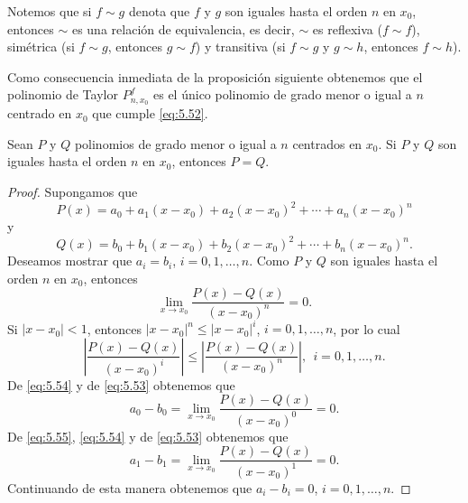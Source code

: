 \documentclass[12pt,a4paper]{book}
\begin{document}
    Notemos que si $f\sim g$ denota que $f$ y $g$ son iguales hasta el orden $n$ en $x_{0}$,
    entonces $\sim$ es una relación de equivalencia, es decir, $\sim$ es reflexiva ($f\sim f$),
    simétrica (si $f\sim g$, entonces $g\sim f$) y transitiva (si $f\sim g$ y $g\sim h$, entonces
    $f\sim h$).

    Como consecuencia inmediata de la proposición siguiente obtenemos que
    el polinomio de Taylor $P^{f}_{n,x_{0}}$ es el único polinomio de grado menor o igual a
    $n$ centrado en $x_{0}$ que cumple \eqref{eq:5.52}.

    \begin{proposicion}\label{prop:70}
        Sean $P$ y $Q$ polinomios de grado menor o igual a $n$ centrados
        en $x_{0}$. Si $P$ y $Q$ son iguales hasta el orden $n$ en $x_{0}$, entonces $P=Q$.
    \end{proposicion}

    \begin{proof}
        Supongamos que
        \begin{equation*}
            P(x)=a_{0}+a_{1}(x-x_{0})+a_{2}(x-x_{0})^{2}+\cdots+a_{n}(x-x_{0})^{n}
        \end{equation*}
        y
        \begin{equation*}
            Q(x)=b_{0}+b_{1}(x-x_{0})+b_{2}(x-x_{0})^{2}+\cdots+b_{n}(x-x_{0})^{n}.
        \end{equation*}
        Deseamos mostrar que $a_{i}=b_{i}$, $i=0,1,\ldots,n$. Como $P$ y $Q$ son iguales hasta
        el orden $n$ en $x_{0}$, entonces
        \begin{equation}\label{eq:5.53}
            \lim_{x\to x_{0}}\frac{P(x)-Q(x)}{(x-x_{0})^{n}}=0.
        \end{equation}
        Si $|x-x_{0}|<1$, entonces $|x-x_{0}|^{n}\leq|x-x_{0}|^{i}$, $i=0,1,\ldots,n$, por lo cual
        \begin{equation}\label{eq:5.54}
            \left|\frac{P(x)-Q(x)}{(x-x_{0})^{i}}\right|\leq\left|\frac{P(x)-Q(x)}{(x-x_{0})^{n}}\right|,\ \ i=0,1,\ldots,n.
        \end{equation}
        De \eqref{eq:5.54} y de \eqref{eq:5.53} obtenemos que
        \begin{equation}\label{eq:5.55}
            a_{0}-b_{0}=\lim_{x\to x_{0}}\frac{P(x)-Q(x)}{(x-x_{0})^{0}}=0.
        \end{equation}
        De \eqref{eq:5.55}, \eqref{eq:5.54} y de \eqref{eq:5.53} obtenemos que
        \begin{equation}\label{eq:5.56}
            a_{1}-b_{1}=\lim_{x\to x_{0}}\frac{P(x)-Q(x)}{(x-x_{0})^{1}}=0.
        \end{equation}
        Continuando de esta manera obtenemos que $a_{i}-b_{i}=0$, $i=0,1,\ldots,n$.
    \end{proof}
\end{document}
